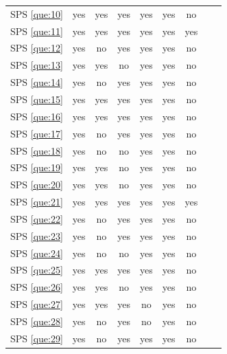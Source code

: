 \documentclass[sensors,review,accept,moreauthors,pdftex]{Definitions/mdpi}
\begin{document}
\begin{table}[H]
\begin{tabular}{ccccccccc}
		SPS \ref{que:10}& yes & yes& yes& yes& yes& no\\
		
		SPS \ref{que:11}& yes & yes& yes& yes& yes& yes\\
		
		SPS \ref{que:12}& yes & no& yes& yes& yes& no\\
		
		SPS \ref{que:13}& yes & yes& no& yes& yes& no\\
		
		SPS \ref{que:14}& yes & no& yes& yes& yes& no\\
		
		SPS \ref{que:15}& yes & yes& yes& yes& yes& no\\
		
		SPS \ref{que:16}& yes & yes& yes& yes& yes& no\\
		
		SPS \ref{que:17}& yes & no& yes& yes& yes& no\\
		
		SPS \ref{que:18}& yes & no& no& yes& yes& no\\
		
		SPS \ref{que:19}& yes & yes& no& yes& yes& no\\
		
		SPS \ref{que:20}& yes & yes& no& yes& yes& no\\
		
		SPS \ref{que:21}& yes & yes& yes& yes& yes& yes\\
		
		SPS \ref{que:22}& yes & no& yes& yes& yes& no\\
		
		SPS \ref{que:23}& yes & no& yes& yes& yes& no\\
		
		SPS \ref{que:24}& yes &no&no& yes& yes& no\\
		
		SPS \ref{que:25}& yes & yes& yes& yes& yes& no\\
		
		SPS \ref{que:26}& yes & yes& no& yes& yes& no\\
		
		SPS \ref{que:27}& yes & yes& yes& no& yes& no\\
		
		SPS \ref{que:28}& yes & no& yes& no& yes& no\\
		
		SPS \ref{que:29}& yes & no& yes& yes& yes&no\\
		

\end{tabular}
\end{table}
\end{document}
